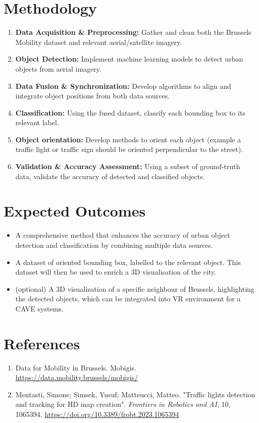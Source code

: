 \documentclass{article}
\begin{document}
\section{Methodology}

\begin{enumerate}
    \item \textbf{Data Acquisition \& Preprocessing:} Gather and clean both the Brussels Mobility dataset and relevant aerial/satellite imagery.
    \item \textbf{Object Detection:} Implement machine learning models to detect urban objects from aerial imagery.
    \item \textbf{Data Fusion \& Synchronization:} Develop algorithms to align and integrate object positions from both data sources.
    \item \textbf{Classification:} Using the fused dataset, classify each bounding box to its relevant label.
    \item \textbf{Object orientation:} Develop methods to orient each object (example a traffic light or traffic sign should be oriented perpendicular to the street).
    \item \textbf{Validation \& Accuracy Assessment:} Using a subset of ground-truth data, validate the accuracy of detected and classified objects.
\end{enumerate}

\section{Expected Outcomes}

\begin{itemize}
    \item A comprehensive method that enhances the accuracy of urban object detection and classification by combining multiple data sources.
    \item A dataset of oriented bounding box, labelled to the relevant object. This dataset will then be used to enrich a 3D visualisation of the city. 
    \item (optional) A 3D visualization of a specific neighbour of Brussels, highlighting the detected objects, which can be integrated into VR environment for a CAVE systems.
\end{itemize}

\section{References}

\begin{enumerate}
    \item Data for Mobility in Brussels. Mobigis. \url{https://data.mobility.brussels/mobigis/}
    \item Mentasti, Simone; Simsek, Yusuf; Matteucci, Matteo. "Traffic lights detection and tracking for HD map creation". \textit{Frontiers in Robotics and AI}, 10, 1065394. \href{https://doi.org/10.3389/frobt.2023.1065394}{https://doi.org/10.3389/frobt.2023.1065394}
\end{enumerate}
\end{document}
